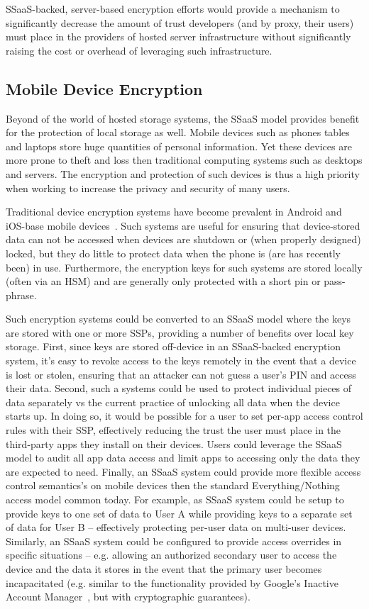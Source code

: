 SSaaS-backed, server-based encryption efforts would provide a
mechanism to significantly decrease the amount of trust developers
(and by proxy, their users) must place in the providers of hosted
server infrastructure without significantly raising the cost or
overhead of leveraging such infrastructure.

\subsection{Mobile Device Encryption}

Beyond of the world of hosted storage systems, the SSaaS model
provides benefit for the protection of local storage as well. Mobile
devices such as phones tables and laptops store huge quantities of
personal information. Yet these devices are more prone to theft and
loss then traditional computing systems such as desktops and
servers. The encryption and protection of such devices is thus a high
priority when working to increase the privacy and security of many
users.

Traditional device encryption systems have become prevalent in Android
and iOS-base mobile devices~\cite{ars-android-encrypt,
  ars-ios-encrypt}. Such systems are useful for ensuring that
device-stored data can not be accessed when devices are shutdown or
(when properly designed) locked, but they do little to protect data
when the phone is (are has recently been) in use. Furthermore, the
encryption keys for such systems are stored locally (often via an HSM)
and are generally only protected with a short pin or pass-phrase.

Such encryption systems could be converted to an SSaaS model where the
keys are stored with one or more SSPs, providing a number of benefits
over local key storage. First, since keys are stored off-device in an
SSaaS-backed encryption system, it's easy to revoke access to the keys
remotely in the event that a device is lost or stolen, ensuring that
an attacker can not guess a user's PIN and access their data. Second,
such a systems could be used to protect individual pieces of data
separately vs the current practice of unlocking all data when the
device starts up. In doing so, it would be possible for a user to set
per-app access control rules with their SSP, effectively reducing the
trust the user must place in the third-party apps they install on
their devices. Users could leverage the SSaaS model to audit all app
data access and limit apps to accessing only the data they are
expected to need. Finally, an SSaaS system could provide more flexible
access control semantics's on mobile devices then the standard
Everything/Nothing access model common today. For example, as SSaaS
system could be setup to provide keys to one set of data to User A
while providing keys to a separate set of data for User B --
effectively protecting per-user data on multi-user devices. Similarly,
an SSaaS system could be configured to provide access overrides in
specific situations -- e.g. allowing an authorized secondary user to
access the device and the data it stores in the event that the primary
user becomes incapacitated (e.g. similar to the functionality provided
by Google's Inactive Account Manager~\cite{atlantic-google-iam}, but
with cryptographic guarantees).

